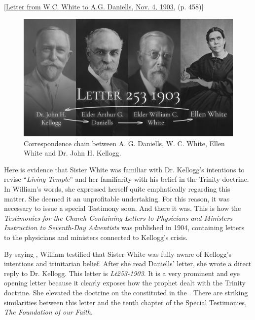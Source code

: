 [\href{https://ellenwhite.org/letterbooks/555}{Letter from W.C. White to A.G. Daniells, Nov. 4, 1903,} (p. 458)]

\begin{figure}[h]
    \centering
    \includegraphics[width=1\linewidth]{images/correspondance.jpg}
    \caption*{Correspondence chain between A. G. Daniells, W. C. White, Ellen White and Dr. John H. Kellogg.}
    \label{fig:corespondance}
\end{figure}

Here is evidence that Sister White was familiar with Dr. Kellogg's intentions to revise “\textit{Living Temple}” and her familiarity with his belief in the Trinity doctrine. In William's words, she expressed herself quite emphatically regarding this matter. She deemed it an unprofitable undertaking. For this reason, it was necessary to issue a special Testimony soon. And there it was. This is how the \textit{Testimonies for the Church Containing Letters to Physicians and Ministers Instruction to Seventh-Day Adventists} was published in 1904, containing letters to the physicians and ministers connected to Kellogg's crisis.  

By saying , William testified that Sister White was fully aware of Kellogg's intentions and trinitarian belief. After she read Daniells’ letter, she wrote a direct reply to Dr. Kellogg. This letter is \textit{Lt253-1903}. It is a very prominent and eye opening letter because it clearly exposes how the prophet dealt with the Trinity doctrine. She elevated the doctrine on the  constituted in the . There are striking similarities between this letter and the tenth chapter of the Special Testimonies, \textit{The Foundation of our Faith}.


